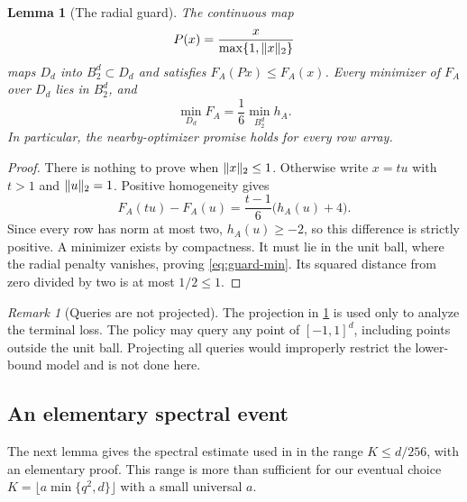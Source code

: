 \documentclass[11pt]{article}
\numberwithin{equation}{section}
\newtheorem{lemma}[lemma]{Lemma}
\theoremstyle{definition}
\theoremstyle{remark}
\newtheorem{remark}[remark]{Remark}
\DeclarePairedDelimiter{\norm}{\lVert}{\rVert}
\newcommand{\ball}{B_2^d}
\begin{document}
\begin{lemma}[The radial guard]\label{lem:guard}
The continuous map
\begin{equation}\label{eq:radial-projection}
P(x)=\frac{x}{\max\{1,\norm{x}_2\}}
\end{equation}
maps $D_d$ into $\ball\subset D_d$ and satisfies $F_A(Px)\le F_A(x)$. Every minimizer of $F_A$ over $D_d$ lies in $\ball$, and
\begin{equation}\label{eq:guard-min}
\min_{D_d}F_A=\frac16\min_{\ball}h_A.
\end{equation}
In particular, the nearby-optimizer promise holds for every row array.
\end{lemma}
\begin{proof}
There is nothing to prove when $\norm{x}_2\le1$. Otherwise write $x=tu$ with $t>1$ and $\norm{u}_2=1$. Positive homogeneity gives
\[
F_A(tu)-F_A(u)=\frac{t-1}6\bigl(h_A(u)+4\bigr).
\]
Since every row has norm at most two, $h_A(u)\ge-2$, so this difference is strictly positive. A minimizer exists by compactness. It must lie in the unit ball, where the radial penalty vanishes, proving \eqref{eq:guard-min}. Its squared distance from zero divided by two is at most $1/2\le1$.
\end{proof}

\begin{remark}[Queries are not projected]
The projection in \cref{lem:guard} is used only to analyze the terminal loss. The policy may query any point of $[-1,1]^d$, including points outside the unit ball. Projecting all queries would improperly restrict the lower-bound model and is not done here.
\end{remark}

\subsection{An elementary spectral event}

The next lemma gives the spectral estimate used in \cite[Theorem~40]{ZZQL2026} in the range $K\le d/256$, with an elementary proof. This range is more than sufficient for our eventual choice $K=\lfloor a\min\{q^2,d\}\rfloor$ with a small universal $a$.
\end{document}

